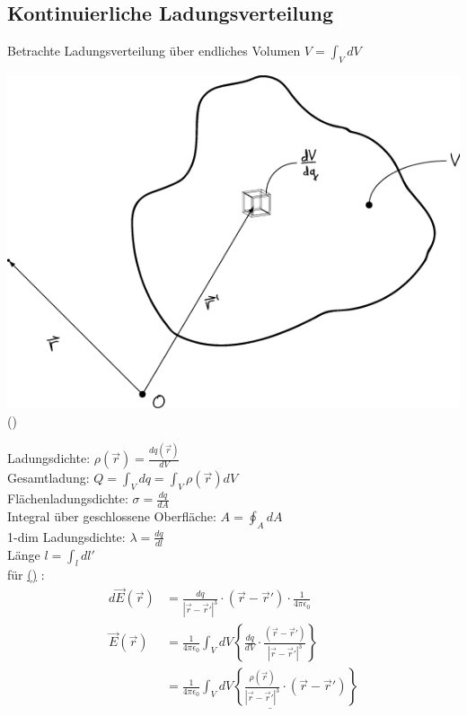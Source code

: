 \documentclass[11pt]{article}
\begin{document}
		
	\subsection{Kontinuierliche Ladungsverteilung}
	
		Betrachte Ladungsverteilung über endliches Volumen $ V = {\displaystyle \int_V dV} $
		\begin{center}
			\hypertarget{ref1}{}
			\includegraphics[width=0.5\linewidth]{skizzen/14/14_5B0}
			(\textasteriskcentered)
		\end{center}
		Ladungsdichte: $ \rho(\vec{r}) = \frac{dq(\vec{r})}{dV} $ \\
		Gesamtladung: $ Q = {\displaystyle\int_V dq} = {\displaystyle\int_V} \rho(\vec{r}) dV  $ \\
		Flächenladungsdichte: $ \sigma = \frac{dq}{dA} $ \\
		
		Integral über geschlossene Oberfläche: $ A = {\displaystyle\oint_A} dA $ \\
		1-dim Ladungsdichte: $ \lambda = \frac{dq}{dl} $ \\
		Länge $ l = {\displaystyle\int_l dl'} $ \\
		für \hyperlink{ref1}{(\textasteriskcentered)} :
		\begin{align*}
		d\vec{E}(\vec{r}) &= \frac{dq}{| \vec{r}-\vec{r}' |^3} \cdot (\vec{r}-\vec{r}') \cdot \frac{1}{4\pi\epsilon_0} \\
		\vec{E}(\vec{r}) &= \frac{1}{4\pi\epsilon_0} {\displaystyle\int_V dV} \left\{ \frac{dq}{dV} \cdot \frac{(\vec{r}-\vec{r}')}{| \vec{r}-\vec{r}' |^3} \right\} \\
		&=\underline{\frac{1}{4\pi\epsilon_0} {\displaystyle\int_V dV} \left\{ \frac{ \rho(\vec{r}) }{| \vec{r}-\vec{r}' |^3} \cdot (\vec{r}-\vec{r}') \right\}}
		\end{align*}
		
\end{document}
